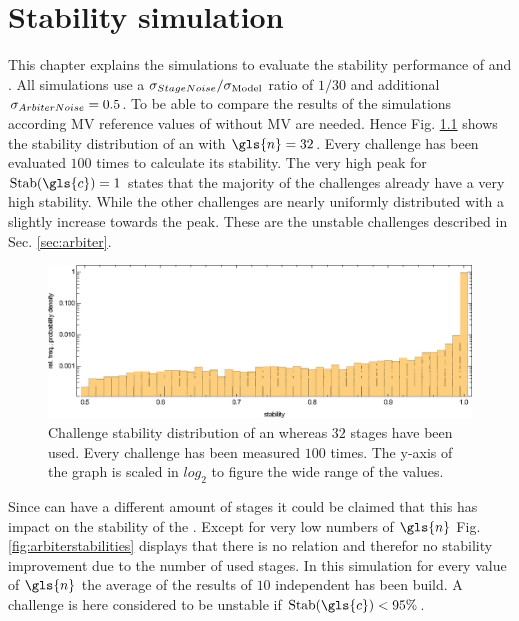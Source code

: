 \chapter{Stability simulation}
\label{cap:stabilitysimulation}

This chapter explains the simulations to evaluate the stability performance of \mpufs and \mxpufs.
All simulations use a $\sigma_{Stage Noise}/\sigma_{\mathrm{Model}}$ ratio of $1/30$ and additional $\sigma_{Arbiter Noise} = 0.5$.
To be able to compare the results of the simulations according \ac{MV} reference values of \apufs without \ac{MV} are needed.
Hence Fig. \ref{fig:arbiterstabilitydistribution} shows the stability distribution of an \apuf with $\gls{n} = 32$.
Every challenge has been evaluated $100$ times to calculate its stability.
The very high peak for $\Stab(\gls{c}) = 1$ states that the majority of the challenges already have a very high stability.
While the other challenges are nearly uniformly distributed with a slightly increase towards the peak.
These are the unstable challenges described in Sec. \ref{sec:arbiter}.

\begin{figure}[ht]
\includegraphics[width=1.00\textwidth]{images/arbiter-stability-distribution-simulation.eps}
\caption{Challenge stability distribution of an \apuf whereas $32$ stages have been used. Every challenge has been measured $100$ times. The y-axis of the graph is scaled in $log_2$ to figure the wide range of the values.} 
\label{fig:arbiterstabilitydistribution}
\end{figure}

Since \apufs can have a different amount of stages it could be claimed that this has impact on the stability of the \puf.
Except for very low numbers of $\gls{n}$ Fig. \ref{fig:arbiterstabilities} displays that there is no relation and therefor no stability improvement due to the number of used stages.
In this simulation for every value of $\gls{n}$ the average of the results of $10$ independent \apufs has been build.
A challenge is here considered to be unstable if $\Stab(\gls{c}) < 95 \%$.

